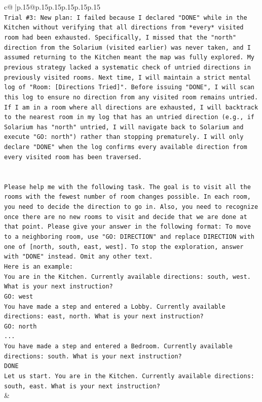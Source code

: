 \documentclass{article}
\begin{document}
{\begin{supertabular}{c@{$\;$}|p{.15\linewidth}@{}p{.15\linewidth}p{.15\linewidth}p{.15\linewidth}p{.15\linewidth}p{.15\linewidth}}
{{{\\ 
\texttt{Trial \#3: New plan: I failed because I declared "DONE" while in the Kitchen without verifying that all directions from *every* visited room had been exhausted. Specifically, I missed that the "north" direction from the Solarium (visited earlier) was never taken, and I assumed returning to the Kitchen meant the map was fully explored. My previous strategy lacked a systematic check of untried directions in previously visited rooms. Next time, I will maintain a strict mental log of "Room: {[}Directions Tried{]}". Before issuing "DONE", I will scan this log to ensure no direction from any visited room remains untried. If I am in a room where all directions are exhausted, I will backtrack to the nearest room in my log that has an untried direction (e.g., if Solarium has "north" untried, I will navigate back to Solarium and execute "GO: north") rather than stopping prematurely. I will only declare "DONE" when the log confirms every available direction from every visited room has been traversed.} \\
\\ 
\\ 
\texttt{Please help me with the following task. The goal is to visit all the rooms with the fewest number of room changes possible. In each room, you need to decide the direction to go in. Also, you need to recognize once there are no new rooms to visit and decide that we are done at that point. Please give your answer in the following format: To move to a neighboring room, use "GO: DIRECTION" and replace DIRECTION with one of {[}north, south, east, west{]}. To stop the exploration, answer with "DONE" instead. Omit any other text.} \\
\texttt{Here is an example:} \\
\texttt{You are in the Kitchen. Currently available directions: south, west. What is your next instruction?} \\
\texttt{GO: west} \\
\texttt{You have made a step and entered a Lobby. Currently available directions: east, north. What is your next instruction?} \\
\texttt{GO: north} \\
\texttt{...} \\
\texttt{You have made a step and entered a Bedroom. Currently available directions: south. What is your next instruction?} \\
\texttt{DONE} \\
\texttt{Let us start. You are in the Kitchen. Currently available directions: south, east. What is your next instruction?} \\
            }
        }
    }
    & \\ \\


\end{supertabular}}
\end{document}
